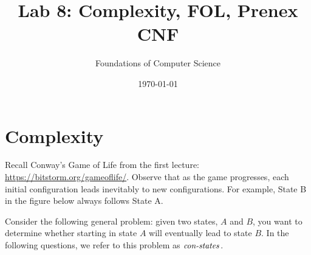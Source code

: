 \documentclass[]{exam}
\title{Lab 8: Complexity, FOL, Prenex CNF}
\author{Foundations of Computer Science}
\date{\today}
\begin{document}
\maketitle
\setlength{\columnseprule}{1pt}
\section*{Complexity}
\begin{questions} 
\question Recall Conway's Game of Life from the first lecture:
\url{https://bitstorm.org/gameoflife/}. Observe that as the game
progresses, each initial configuration leads inevitably to new
configurations. For example, State B in the figure below always
follows State A.
\begin{figure}[h]
\centering
{}
\qquad
{}
\end{figure}
Consider the following general problem: given two states, $A$ and $B$, you
want to determine whether starting in state $A$ will eventually lead to
state $B$. In the following questions, we refer to this problem as
$\mbox{\it con-states\/}$.
\end{questions}
\end{document}
